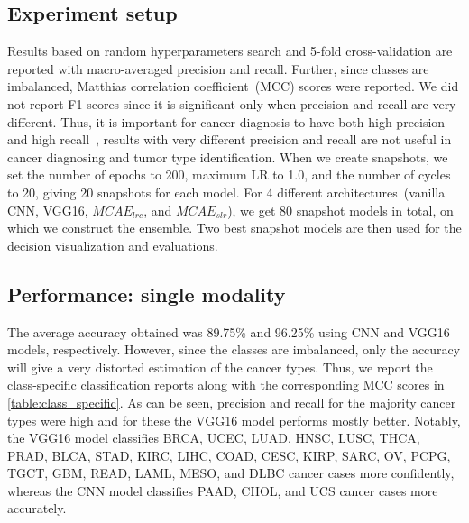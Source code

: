 \subsection{Experiment setup}
Results based on random hyperparameters search and 5-fold cross-validation are reported with macro-averaged precision and recall. Further, since classes are imbalanced, Matthias correlation coefficient~(MCC) scores were reported. We did not report F1-scores since it is significant only when precision and recall are very different. Thus, it is important for cancer diagnosis to have both high precision and high recall~\cite{naulaerts2017precision}, results with very different precision and recall are not useful in cancer diagnosing and tumor type identification. 
When we create snapshots, we set the number of epochs to 200, maximum LR to 1.0, and the number of cycles to 20, giving 20 snapshots for each model. For 4 different architectures~(vanilla CNN, VGG16, $MCAE_{lrc}$, and $MCAE_{slr}$), we get 80 snapshot models in total, on which we construct the ensemble. Two best snapshot models are then used for the decision visualization and evaluations. 

\subsection{Performance: single modality}
The average accuracy obtained was 89.75\% and 96.25\% using CNN and VGG16 models, respectively. However, since the classes are imbalanced, only the accuracy will give a very distorted estimation of the cancer types. Thus, we report the class-specific classification reports along with the corresponding MCC scores in \cref{table:class_specific}. As can be seen, precision and recall for the majority cancer types were high and for these the VGG16 model performs mostly better. Notably, the VGG16 model classifies BRCA, UCEC, LUAD, HNSC, LUSC, THCA, PRAD, BLCA, STAD, KIRC, LIHC, COAD, CESC, KIRP, SARC, OV, PCPG, TGCT, GBM, READ, LAML, MESO, and DLBC cancer cases more confidently, whereas the CNN model classifies PAAD, CHOL, and UCS cancer cases more accurately. 


